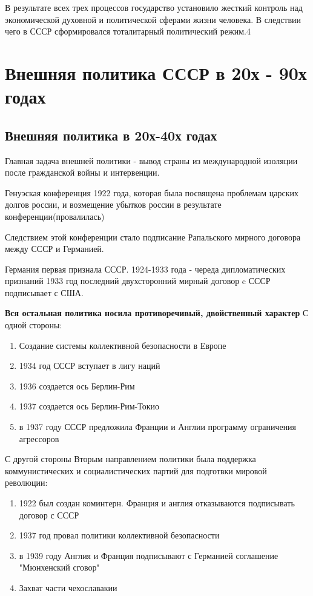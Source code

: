 \documentclass[a4paper]{article}
\begin{document}
В результате всех трех процессов государство установило жесткий контроль над экономической духовной и политической сферами жизни человека. В следствии чего в СССР сформировался тоталитарный политический режим.4

\section{Внешняя политика СССР в 20х - 90х годах}

\subsection{Внешняя политика в 20х-40х годах}
Главная задача внешней политики - вывод страны из международной изоляции после гражданской войны и интервенции.

Генуэская конференция 1922 года, которая была посвящена проблемам царских долгов россии, и возмещение убытков россии в результате конференции(провалилась)

Следствием этой конференции стало подписание Рапальского мирного договора между СССР и Германией.

Германия первая признала СССР.
1924-1933 года - череда дипломатических признаний
1933 год последний двухсторонний мирный договор c СССР подписывает с США.

\textbf{Вся остальная политика носила противоречивый, двойственный характер}
С одной стороны:
\begin{enumerate}
    \item Создание системы коллективной безопасности в Европе
    \item 1934 год СССР вступает в лигу наций
    \item 1936 создается ось Берлин-Рим
    \item 1937 создается ось Берлин-Рим-Токио
    \item в 1937 году СССР предложила Франции и Англии программу ограничения агрессоров
\end{enumerate}

С другой стороны
Вторым направлением политики была поддержка коммунистических и социалистических партий для подготвки мировой революции:

\begin{enumerate}
    \item 1922 был создан коминтерн.
    Франция и англия отказываются подписывать договор с СССР
    \item 1937 год провал политики коллективной безопасности
    \item в 1939 году Англия и Франция подписывают с Германией соглашение "Мюнхенский сговор"
    \item Захват части чехославакии
\end{enumerate}
\end{document}
